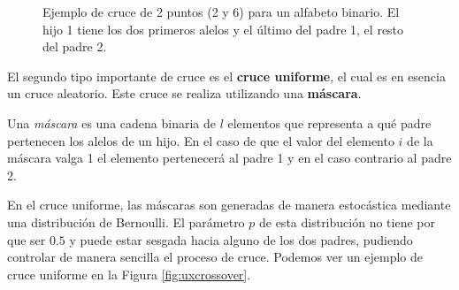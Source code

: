 \begin{figure}[t]
    \centering
    \caption{Ejemplo de cruce de 2 puntos (2 y 6) para un alfabeto binario. El hijo 1 tiene los dos primeros alelos y el último del padre 1, el resto del padre 2.}
    \label{fig:2xcrossover}
\end{figure}

El segundo tipo importante de cruce es el \textbf{cruce uniforme}, el cual es en esencia un cruce aleatorio. Este cruce se realiza utilizando una \textbf{máscara}.
\begin{definition}\label{def:mascara}
    Una \textit{máscara} es una cadena binaria de $l$ elementos que representa a qué padre pertenecen los alelos de un hijo. En el caso de que el valor del elemento $i$ de la máscara valga 1 el elemento pertenecerá al padre 1 y en el caso contrario al padre 2.
\end{definition}
En el cruce uniforme, las máscaras son generadas de manera estocástica mediante una distribución de Bernoulli. El parámetro $p$ de esta distribución no tiene por que ser $0.5$ y puede estar sesgada hacia alguno de los dos padres, pudiendo controlar de manera sencilla el proceso de cruce. Podemos ver un ejemplo de cruce uniforme en la Figura \ref{fig:uxcrossover}.

